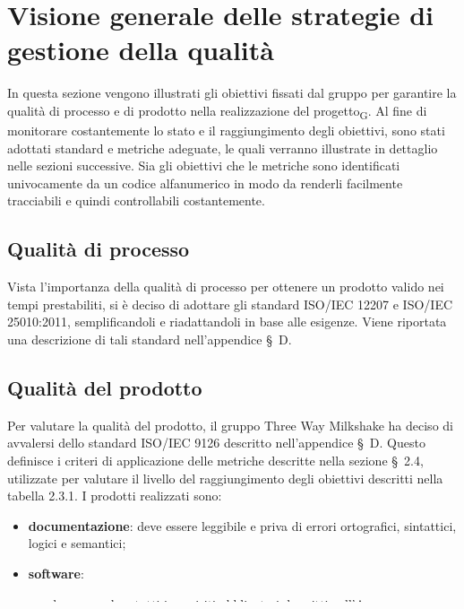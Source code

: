 \section{Visione generale delle strategie di gestione della qualità}
In questa sezione vengono illustrati gli obiettivi fissati dal gruppo per garantire la qualità di processo e di prodotto nella realizzazione del progetto\textsubscript{G}.
Al fine di monitorare costantemente lo stato e il raggiungimento degli obiettivi, sono stati adottati standard e metriche adeguate, le quali verranno illustrate in dettaglio nelle sezioni successive.
Sia gli obiettivi che le metriche sono identificati univocamente da un codice alfanumerico in modo da renderli facilmente tracciabili e quindi controllabili costantemente.

\subsection{Qualità di processo}
Vista l'importanza della qualità di processo per ottenere un prodotto valido nei tempi prestabiliti, si è deciso di adottare gli standard ISO/IEC 12207 e ISO/IEC 25010:2011, semplificandoli e riadattandoli in base alle esigenze. Viene riportata una descrizione di tali standard nell'appendice \S\ D.

\subsection{Qualità del prodotto}
Per valutare la qualità del prodotto, il gruppo Three Way Milkshake ha deciso di avvalersi dello standard ISO/IEC 9126 descritto nell'appendice \S\ D. Questo definisce i criteri di applicazione delle metriche descritte nella sezione \S\ 2.4, utilizzate per valutare il livello del raggiungimento degli obiettivi descritti nella tabella 2.3.1.
I prodotti realizzati sono:
\begin{itemize}
    \item \textbf{documentazione}: deve essere leggibile e priva di errori ortografici, sintattici, logici e semantici;
    \item \textbf{software}:
    \begin{itemize}
        \item deve possedere tutti i requisiti obbligatori descritti nell'\textsc{Analisi dei Requisiti};
        \item deve essere leggibile, comprensibile e mantenibile;
        \item deve essere ampiamente testato e robusto.
    \end{itemize}
\end{itemize}
\pagebreak
